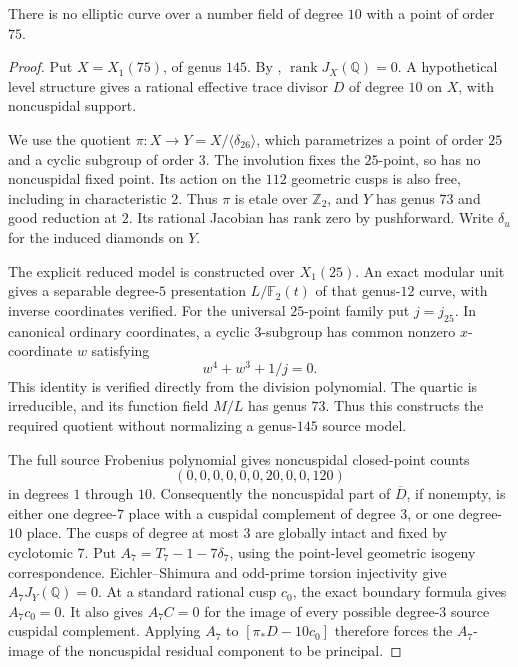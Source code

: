 \begin{proposition}\label{prop:decic75-exclusion}
There is no elliptic curve over a number field of degree $10$
with a point of order $75$.
\end{proposition}
\begin{proof}
Put $X=X_1(75)$, of genus $145$. By \cite[Theorem~3.1]{DEHMZ},
$\operatorname{rank}J_X(\mathbb Q)=0$.
A hypothetical level structure gives a rational effective
trace divisor $D$ of degree $10$ on $X$, with noncuspidal support.

We use the quotient $\pi:X\to Y=X/\langle\delta_{26}\rangle$,
which parametrizes a point of order $25$ and a cyclic subgroup
of order $3$. The involution fixes the $25$-point, so has no
noncuspidal fixed point. Its action on the $112$ geometric cusps
is also free, including in characteristic $2$. Thus $\pi$ is
etale over $\mathbb Z_2$, and $Y$ has genus $73$ and good
reduction at $2$. Its rational Jacobian has rank zero by
pushforward. Write $\delta_u$ for the induced diamonds on $Y$.

The explicit reduced model is constructed over $X_1(25)$.
An exact modular unit gives a separable degree-$5$ presentation
$L/\mathbb F_2(t)$ of that genus-$12$ curve, with inverse
coordinates verified. For the universal $25$-point family put
$j=j_{25}$. In canonical ordinary coordinates, a cyclic
$3$-subgroup has common nonzero $x$-coordinate $w$ satisfying
\[
 w^4+w^3+1/j=0.
\]
This identity is verified directly from the division polynomial.
The quartic is irreducible, and its function field $M/L$ has
genus $73$. Thus this constructs the required quotient without
normalizing a genus-$145$ source model.

The full source Frobenius polynomial gives noncuspidal
closed-point counts
\[
 (0,0,0,0,0,0,20,0,0,120)
\]
in degrees $1$ through $10$. Consequently the noncuspidal part
of $\overline D$, if nonempty, is either one degree-$7$ place
with a cuspidal complement of degree $3$, or one degree-$10$
place. The cusps of degree at most $3$ are globally intact and
fixed by cyclotomic $7$.
Put $A_7=T_7-1-7\delta_7$, using the point-level geometric
isogeny correspondence. Eichler--Shimura and odd-prime torsion
injectivity give $A_7J_Y(\mathbb Q)=0$. At a standard rational
cusp $c_0$, the exact boundary formula gives $A_7c_0=0$.
It also gives $A_7C=0$ for the image of every possible degree-$3$
source cuspidal complement. Applying $A_7$ to
$[\pi_*D-10c_0]$ therefore forces the $A_7$-image of the
noncuspidal residual component to be principal.


\end{proof}
